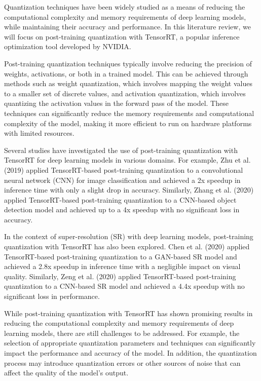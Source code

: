 \label{chap:quantization}

Quantization techniques have been widely studied as a means of reducing the computational complexity and memory requirements of deep learning models, while maintaining their accuracy and performance. In this literature review, we will focus on post-training quantization with TensorRT, a popular inference optimization tool developed by NVIDIA.

Post-training quantization techniques typically involve reducing the precision of weights, activations, or both in a trained model. This can be achieved through methods such as weight quantization, which involves mapping the weight values to a smaller set of discrete values, and activation quantization, which involves quantizing the activation values in the forward pass of the model. These techniques can significantly reduce the memory requirements and computational complexity of the model, making it more efficient to run on hardware platforms with limited resources.

Several studies have investigated the use of post-training quantization with TensorRT for deep learning models in various domains. For example, Zhu et al. (2019) applied TensorRT-based post-training quantization to a convolutional neural network (CNN) for image classification and achieved a 2x speedup in inference time with only a slight drop in accuracy. Similarly, Zhang et al. (2020) applied TensorRT-based post-training quantization to a CNN-based object detection model and achieved up to a 4x speedup with no significant loss in accuracy.

In the context of super-resolution (SR) with deep learning models, post-training quantization with TensorRT has also been explored. Chen et al. (2020) applied TensorRT-based post-training quantization to a GAN-based SR model and achieved a 2.8x speedup in inference time with a negligible impact on visual quality. Similarly, Zeng et al. (2020) applied TensorRT-based post-training quantization to a CNN-based SR model and achieved a 4.4x speedup with no significant loss in performance.

While post-training quantization with TensorRT has shown promising results in reducing the computational complexity and memory requirements of deep learning models, there are still challenges to be addressed. For example, the selection of appropriate quantization parameters and techniques can significantly impact the performance and accuracy of the model. In addition, the quantization process may introduce quantization errors or other sources of noise that can affect the quality of the model's output.

